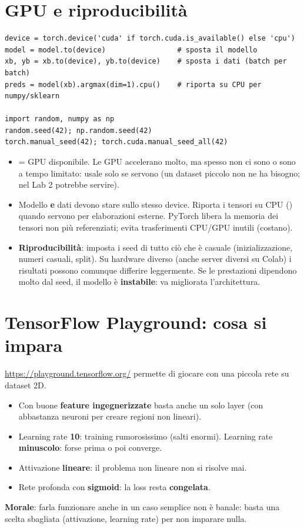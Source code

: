 \section{GPU e riproducibilità}
\begin{lstlisting}
device = torch.device('cuda' if torch.cuda.is_available() else 'cpu')
model = model.to(device)                 # sposta il modello
xb, yb = xb.to(device), yb.to(device)    # sposta i dati (batch per batch)
preds = model(xb).argmax(dim=1).cpu()    # riporta su CPU per numpy/sklearn

import random, numpy as np
random.seed(42); np.random.seed(42)
torch.manual_seed(42); torch.cuda.manual_seed_all(42)
\end{lstlisting}
\begin{itemize}
  \item {} = GPU disponibile. Le GPU accelerano molto, ma spesso non ci sono o sono a tempo limitato: usale solo se servono
        (un dataset piccolo non ne ha bisogno; nel Lab 2 potrebbe servire).
  \item Modello \textbf{e} dati devono stare sullo stesso device. Riporta i tensori su CPU () quando servono per elaborazioni
        esterne. PyTorch libera la memoria dei tensori non più referenziati; evita trasferimenti CPU/GPU inutili (costano).
  \item \textbf{Riproducibilità}: imposta i seed di tutto ciò che è casuale (inizializzazione, numeri casuali, split).
        Su hardware diverso (anche server diversi su Colab) i risultati possono comunque differire leggermente.
        Se le prestazioni dipendono molto dal seed, il modello è \textbf{instabile}: va migliorata l'architettura.
\end{itemize}

\section{TensorFlow Playground: cosa si impara}
\url{https://playground.tensorflow.org/} permette di giocare con una piccola rete su dataset 2D.
\begin{itemize}
  \item Con buone \textbf{feature ingegnerizzate} basta anche un solo layer (con abbastanza neuroni per creare regioni non lineari).
  \item Learning rate \textbf{10}: training rumorosissimo (salti enormi). Learning rate \textbf{minuscolo}: forse prima o poi converge.
  \item Attivazione \textbf{lineare}: il problema non lineare non si risolve mai.
  \item Rete profonda con \textbf{sigmoid}: la loss resta \textbf{congelata}.
\end{itemize}
\textbf{Morale}: farla funzionare anche in un caso semplice non è banale: basta una scelta sbagliata (attivazione, learning rate)
per non imparare nulla.

